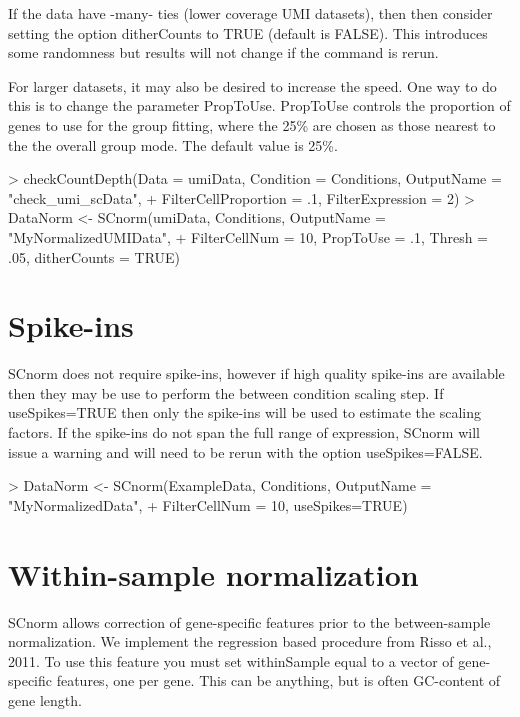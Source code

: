 \documentclass{article}
\begin{document}
If the data have -many- ties (lower coverage UMI datasets), then then consider setting the option ditherCounts to TRUE (default is FALSE). This introduces some randomness but results will not change if the command is rerun.

For larger datasets, it may also be desired to increase the speed. One way to do this is to change the parameter PropToUse. PropToUse controls the proportion of genes to use for the group fitting, where the 25\% are chosen as those nearest to the the overall group mode. The default value is 25\%. 

\begin{Schunk}
\begin{Sinput}
> checkCountDepth(Data = umiData, Condition = Conditions, OutputName = "check_umi_scData",
+ FilterCellProportion = .1, FilterExpression = 2)
> DataNorm <- SCnorm(umiData, Conditions, OutputName = "MyNormalizedUMIData",
+ FilterCellNum = 10, PropToUse = .1, Thresh = .05, ditherCounts = TRUE)
\end{Sinput}
\end{Schunk}

\section{Spike-ins}

SCnorm does not require spike-ins, however if high quality spike-ins are available then they may be use to perform the between condition scaling step. If useSpikes=TRUE then only the spike-ins will be used to estimate the scaling factors. If the spike-ins do not span the full range of expression, SCnorm will issue a warning and will need to be rerun with the option useSpikes=FALSE.
\begin{Schunk}
\begin{Sinput}
> DataNorm <- SCnorm(ExampleData, Conditions, OutputName = "MyNormalizedData",
+                      FilterCellNum = 10, useSpikes=TRUE)
\end{Sinput}
\end{Schunk}

\section{Within-sample normalization}

SCnorm allows correction of gene-specific features prior to the between-sample normalization. We implement the regression based procedure from Risso et al., 2011. To use this feature you must set withinSample equal to a vector of gene-specific features, one per gene. This can be anything, but is often GC-content of gene length.
\end{document}
